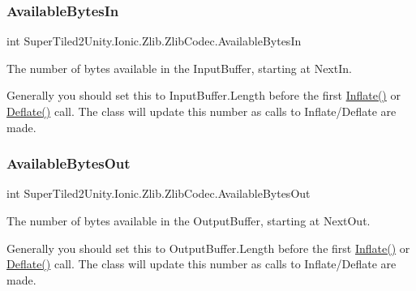 \subsubsection{\texorpdfstring{Available\+Bytes\+In}{AvailableBytesIn}}
{\footnotesize\ttfamily int Super\+Tiled2\+Unity.\+Ionic.\+Zlib.\+Zlib\+Codec.\+Available\+Bytes\+In}



The number of bytes available in the Input\+Buffer, starting at Next\+In. 

Generally you should set this to Input\+Buffer.\+Length before the first \mbox{\hyperlink{class_super_tiled2_unity_1_1_ionic_1_1_zlib_1_1_zlib_codec_a9586e5a25c06331824638439938ac8c8}{Inflate()}} or \mbox{\hyperlink{class_super_tiled2_unity_1_1_ionic_1_1_zlib_1_1_zlib_codec_afeb80a3bb4f9bfdbe76e7364d617808c}{Deflate()}} call. The class will update this number as calls to Inflate/\+Deflate are made. \mbox{\label{class_super_tiled2_unity_1_1_ionic_1_1_zlib_1_1_zlib_codec_a50fd2ef7680382786fe5c35b46a48207}} 
\subsubsection{\texorpdfstring{Available\+Bytes\+Out}{AvailableBytesOut}}
{\footnotesize\ttfamily int Super\+Tiled2\+Unity.\+Ionic.\+Zlib.\+Zlib\+Codec.\+Available\+Bytes\+Out}



The number of bytes available in the Output\+Buffer, starting at Next\+Out. 

Generally you should set this to Output\+Buffer.\+Length before the first \mbox{\hyperlink{class_super_tiled2_unity_1_1_ionic_1_1_zlib_1_1_zlib_codec_a9586e5a25c06331824638439938ac8c8}{Inflate()}} or \mbox{\hyperlink{class_super_tiled2_unity_1_1_ionic_1_1_zlib_1_1_zlib_codec_afeb80a3bb4f9bfdbe76e7364d617808c}{Deflate()}} call. The class will update this number as calls to Inflate/\+Deflate are made. \mbox{\label{class_super_tiled2_unity_1_1_ionic_1_1_zlib_1_1_zlib_codec_a47b2e1b70011088f4a05dbbe16d6cb77}} 
